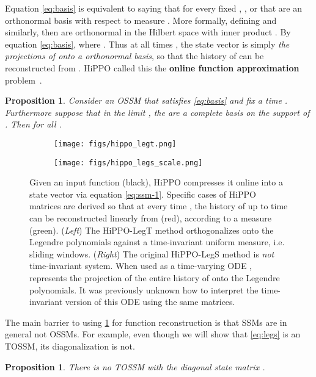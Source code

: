 \documentclass{article}
\newtheorem{proposition}[theorem]{Proposition}
\begin{document}
Equation \eqref{eq:basis} is equivalent to saying that for every fixed , ,
or that  are an orthonormal basis with respect to measure .
More formally, defining  and  similarly, then  are orthonormal in the Hilbert space with inner product .
By equation \eqref{eq:basis},  where .
Thus at all times , the state vector  is simply \emph{the projections of  onto a orthonormal basis},
so that the history of  can
be reconstructed from .
HiPPO called this the \textbf{online function approximation} problem~\citep{gu2020hippo}.


\begin{proposition}\label{prop:hippo-reconstruction}
  Consider an OSSM that satisfies \eqref{eq:basis} and fix a time .
  Furthermore suppose that in the limit ,
  the  are a complete basis on the support of .
Then  for all .
\end{proposition}

\begin{figure}[!t]
\begin{subfigure}{.5\linewidth}\centering
  \texttt{[image: figs/hippo\_legt.png]}
\end{subfigure}
\begin{subfigure}{.5\linewidth}\centering
  \texttt{[image: figs/hippo\_legs\_scale.png]}
\end{subfigure}
\caption{
  Given an input function  (black), HiPPO compresses it online into a state vector  via equation \eqref{eq:ssm-1}. Specific cases of HiPPO matrices  are derived so that at every time , the history of  up to time  can be reconstructed linearly from  (red), according to a measure (green).
  (\emph{Left}) The HiPPO-LegT method orthogonalizes onto the Legendre polynomials against a time-invariant uniform measure, i.e. sliding windows.
  (\emph{Right}) The original HiPPO-LegS method is \emph{not} time-invariant system. When used as a time-varying ODE ,  represents the projection of the entire history of  onto the Legendre polynomials. It was previously unknown how to interpret the time-invariant version of this ODE using the same  matrices.
}
\label{fig:reconstruction-background}
\end{figure}


The main barrier to using \cref{prop:hippo-reconstruction} for function reconstruction is that
SSMs are in general not OSSMs.
For example, even though we will show that \eqref{eq:legs} is an TOSSM, its diagonalization is not.
\begin{proposition}\label{prop:diag-not-ossm}
  There is no TOSSM with the diagonal state matrix .
\end{proposition}
\end{document}
